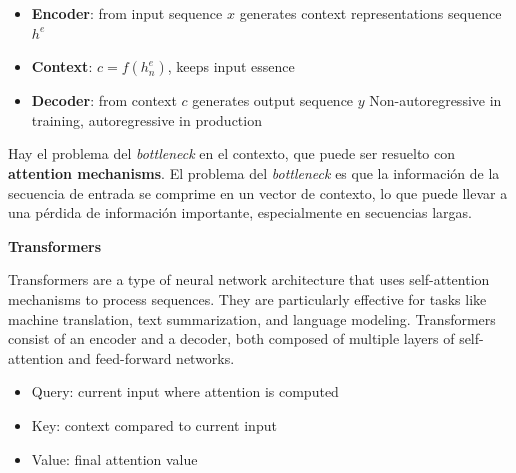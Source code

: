 \begin{itemize}
	\item \textbf{Encoder}: from input sequence $x$ generates context representations
sequence $h^e$
	\item \textbf{Context}: $c = f(h^e_n)$, keeps input essence
	\item \textbf{Decoder}: from context $c$ generates output sequence $y$
Non-autoregressive in training, autoregressive in production
\end{itemize}

Hay el problema del \textit{bottleneck} en el contexto, que puede ser
resuelto con \textbf{attention mechanisms}.
El problema del \textit{bottleneck} es que la información de la secuencia de entrada se comprime en un vector de contexto, lo que puede llevar a una pérdida de información importante, especialmente en secuencias largas.

\textbf{Transformers} 

Transformers are a type of neural network architecture that uses self-attention mechanisms to process sequences. They are particularly effective for tasks like machine translation, text summarization, and language modeling. Transformers consist of an encoder and a decoder, both composed of multiple layers of self-attention and feed-forward networks.

\begin{itemize}
	\item Query: current input where
attention is computed
	\item Key: context compared to
current input
	\item Value: final attention value
\end{itemize}